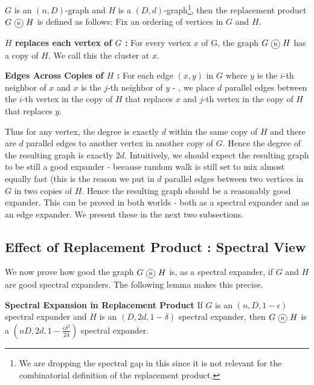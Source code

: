 \begin{definition}
$G$ is an $(n,D)$-graph and $H$ is a $(D,d)$-graph\footnote{We are dropping the spectral gap in this since it is not relevant for the combinatorial definition of the replacement product.}, then the replacement product $G \circled{R} H$ is defined as follows: Fix an ordering of vertices in $G$ and $H$.
\begin{description}
\item{\bf $H$ replaces each vertex of $G$ :} For every vertex $x$ of G, the graph $G \circled{R} H$ has a copy of $H$. We call this the cluster at $x$.
\item{\bf Edges Across Copies of $H$ :}
For each edge $(x,y)$ in $G$ where $y$ is the $i$-th neighbor of $x$ and $x$ is the $j$-th neighbor of $y$ - , we place $d$ parallel edges between the $i$-th vertex in the copy of $H$ that replaces $x$ and $j$-th vertex in the copy of $H$ that replaces $y$. 
\end{description}
\end{definition}

Thus for any vertex, the degree is exactly $d$ within the same copy of $H$ and there are $d$ parallel edges to another vertex in another copy of $G$. Hence the degree of the resulting graph is exactly $2d$.
Intuitively, we should expect the resulting graph to be still a good expander - because random walk is still set to mix almost equally fast (this is the reason we put in $d$ parallel edges between two vertices in $G$ in two copies of $H$. Hence the resulting graph should be a reasonably good expander. This can be proved in both worlds - both as a spectral expander and as an edge expander. We present these in the next two subsections.

\subsection{Effect of Replacement Product : Spectral View}

We now prove how good the graph $G \circled{R} H$ is, as a spectral expander, if $G$ and $H$ are good spectral expanders. The following lemma makes this precise.

\begin{lemma}\textbf{Spectral Expansion in Replacement Product}
If $G$ is an $(n,D,1-\epsilon)$ spectral expander and $H$ is an $(D,2d,1-\delta)$ spectral expander, then $G \circled{R} H$ is a $(nD,2d,1-\frac{\epsilon\delta^2}{24})$ spectral expander.
\end{lemma}
